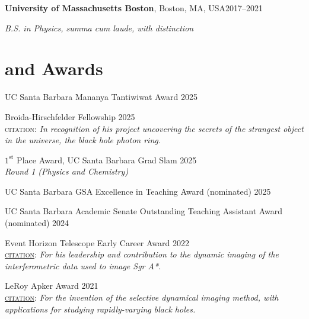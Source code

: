 \documentclass[margin,line]{res}
\begin{document}
\begin{resume}
{\bf University of Massachusetts Boston}, Boston, MA, USA\hfill 2017--2021

\vspace{-.35cm}
{\em B.S. in Physics, summa cum laude, with distinction}


\vspace{-.6cm}

\section{ and Awards} 
\vspace*{0.67cm}

UC Santa Barbara Mananya Tantiwiwat Award \hfill 2025

\vspace*{-2mm}
Broida-Hirschfelder Fellowship  \hfill 2025  \\
{\color{gray}\textsc{citation}: \textit{In recognition of his project uncovering the secrets of the strangest object in the universe, the black hole photon ring.}}

\vspace*{-2mm}
$1^\textrm{st}$ Place Award, UC Santa Barbara Grad Slam  \hfill 2025 \\
{\color{gray}\textit{Round 1 (Physics and Chemistry)}}

\vspace*{-2mm}
UC Santa Barbara GSA Excellence in Teaching Award (nominated) \hfill 2025 

\vspace*{-2mm}
UC Santa Barbara Academic Senate Outstanding Teaching Assistant Award (nominated) \hfill 2024 

\vspace*{-2mm}
Event Horizon Telescope {Early Career Award} \hfill 2022 \\
{\color{gray}\href{https://twitter.com/ehtelescope/status/1602826998346551296}{\textsc{citation}}: \textit{For his leadership and contribution to the dynamic imaging of the interferometric data used to image Sgr A*.}}

\vspace*{-2mm}
{\color{Maroon}LeRoy Apker Award  \hfill 2021}\\
{\color{gray}\href{https://www.aps.org/funding-recognition/award/leroy-apker-award}{\textsc{citation}}: \textit{For the invention of the selective dynamical imaging method, with applications for studying rapidly-varying black holes.}}


\end{resume}
\end{document}
